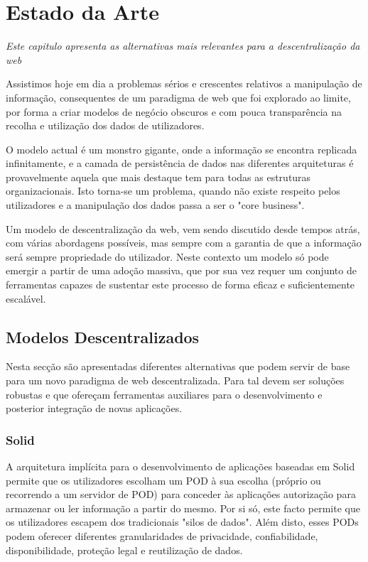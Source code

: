 \chapter{Estado da Arte}
\label{cap:2}
\emph{Este capitulo apresenta as alternativas mais relevantes para a descentralização da web}

Assistimos hoje em dia a problemas sérios e crescentes relativos a manipulação de informação, consequentes de um paradigma de web que foi explorado ao limite, por forma a criar modelos de negócio obscuros e com pouca transparência na recolha e utilização dos dados de utilizadores.

O modelo actual é um monstro gigante, onde a informação se encontra replicada infinitamente, e a camada de persistência de dados nas diferentes arquiteturas é provavelmente aquela que mais destaque tem para todas as estruturas organizacionais. Isto torna-se um problema, quando não existe respeito pelos utilizadores e a manipulação dos dados passa a ser o "core business".

Um modelo de descentralização da web, vem sendo discutido desde tempos atrás, com várias abordagens possíveis, mas sempre com a garantia de que a informação será sempre propriedade do utilizador. Neste contexto um modelo só pode emergir a partir de uma adoção massiva, que por sua vez requer um conjunto de ferramentas capazes de sustentar este processo de forma eficaz e suficientemente escalável.

\section{Modelos Descentralizados}
Nesta secção são apresentadas diferentes alternativas que podem servir de base para um novo paradigma de web descentralizada. Para tal devem ser soluções robustas e que ofereçam ferramentas auxiliares para o desenvolvimento e posterior integração de novas aplicações.

\subsection{Solid}
A arquitetura implícita para o desenvolvimento de aplicações baseadas em Solid permite que os utilizadores escolham um POD à sua escolha (próprio ou recorrendo a um servidor de POD) para conceder às aplicações autorização para armazenar ou ler informação a partir do mesmo. Por si só, este facto permite que os utilizadores escapem dos tradicionais "silos de dados". Além disto, esses PODs podem oferecer diferentes granularidades de privacidade, confiabilidade, disponibilidade, proteção legal e reutilização de dados.\cite{solid_official}

